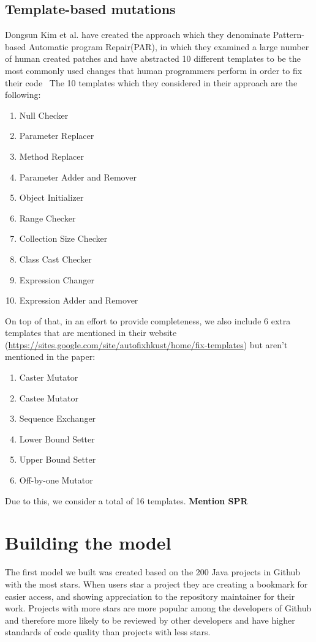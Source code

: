 \documentclass[conference]{IEEEtran}
\newcommand{\todo}[1]
  {{\scriptsize \textbf{\color{red} {#1}}}}
\begin{document}
\subsection{Template-based mutations}
Dongsun Kim et al. have created the approach which they denominate Pattern-based 
Automatic program Repair(PAR), in which they examined a large number of human 
created patches and have abstracted 10 different templates to be the most 
commonly used changes that human programmers perform in order to fix their code~\cite{kim2013}
The 10 templates which they considered in their approach are the following:
\begin{enumerate}
 \item Null Checker
 \item Parameter Replacer
 \item Method Replacer
 \item Parameter Adder and Remover
 \item Object Initializer
 \item Range Checker
 \item Collection Size Checker
 \item Class Cast Checker
 \item Expression Changer
 \item Expression Adder and Remover
\end{enumerate}

On top of that, in an effort to provide completeness, we also include 6 extra templates that are mentioned in their website (\url{https://sites.google.com/site/autofixhkust/home/fix-templates}) but aren't mentioned in the paper\cite{kim2013}: 

\begin{enumerate}
\item Caster Mutator
\item Castee Mutator
\item Sequence Exchanger
\item Lower Bound Setter
\item Upper Bound Setter
\item Off-by-one Mutator
\end{enumerate}

Due to this, we consider a total of 16 templates. \todo{Mention SPR}

\section{Building the model}
The first model we built was created based on the 200 Java projects in Github 
with the most stars. When users star a project they are creating a bookmark for 
easier access, and showing appreciation to the repository maintainer for their 
work. Projects with more stars are more popular among the developers of Github 
and therefore more likely to be reviewed by other developers and have higher 
standards of code quality than projects with less stars.
\end{document}
